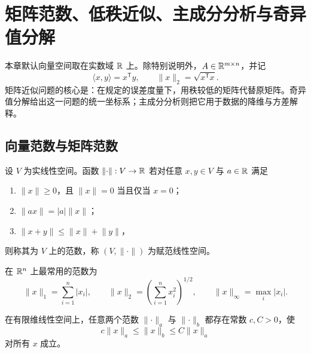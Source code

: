 %
%

\chapter{矩阵范数、低秩近似、主成分分析与奇异值分解}

本章默认向量空间取在实数域 $\mathbb{R}$ 上。除特别说明外，$A\in\mathbb{R}^{m\times n}$，并记
\[
\langle x,y\rangle=x^{\mathsf T}y,
\qquad
\lVert x\rVert_2=\sqrt{x^{\mathsf T}x}.
\]
矩阵近似问题的核心是：在规定的误差度量下，用秩较低的矩阵代替原矩阵。奇异值分解给出这一问题的统一坐标系；主成分分析则把它用于数据的降维与方差解释。

\section{向量范数与矩阵范数}

\begin{definition}[范数]
设 $V$ 为实线性空间。函数 $\lVert\cdot\rVert:V\to\mathbb{R}$ 若对任意 $x,y\in V$ 与 $a\in\mathbb{R}$ 满足
\begin{enumerate}
\item $\lVert x\rVert\ge0$，且 $\lVert x\rVert=0$ 当且仅当 $x=0$；
\item $\lVert ax\rVert=|a|\lVert x\rVert$；
\item $\lVert x+y\rVert\le\lVert x\rVert+\lVert y\rVert$，
\end{enumerate}
则称其为 $V$ 上的范数，称 $(V,\lVert\cdot\rVert)$ 为赋范线性空间。
\end{definition}

在 $\mathbb{R}^n$ 上最常用的范数为
\[
\lVert x\rVert_1=\sum_{i=1}^n|x_i|,
\qquad
\lVert x\rVert_2=\left(\sum_{i=1}^nx_i^2\right)^{1/2},
\qquad
\lVert x\rVert_\infty=\max_i|x_i|.
\]

\begin{proposition}[有限维空间中范数等价]
在有限维线性空间上，任意两个范数 $\lVert\cdot\rVert_a$ 与 $\lVert\cdot\rVert_b$ 都存在常数 $c,C>0$，使
\[
c\lVert x\rVert_a\le\lVert x\rVert_b\le C\lVert x\rVert_a
\]
对所有 $x$ 成立。
\end{proposition}

